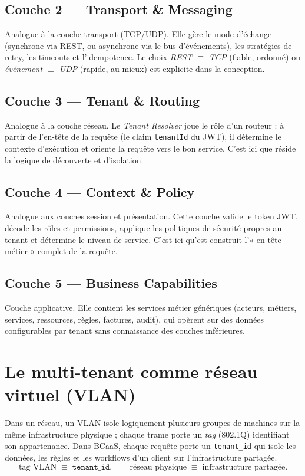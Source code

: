 \subsection{Couche 2 --- Transport \& Messaging}
Analogue à la couche transport (TCP/UDP). Elle gère le mode d'échange (synchrone via REST,
ou asynchrone via le bus d'événements), les stratégies de retry, les timeouts et
l'idempotence. Le choix \emph{REST $\equiv$ TCP} (fiable, ordonné) ou \emph{événement
$\equiv$ UDP} (rapide, au mieux) est explicite dans la conception.

\subsection{Couche 3 --- Tenant \& Routing}
Analogue à la couche réseau. Le \emph{Tenant Resolver} joue le rôle d'un routeur : à partir
de l'en-tête de la requête (le claim \texttt{tenantId} du JWT), il détermine le contexte
d'exécution et oriente la requête vers le bon service. C'est ici que réside la logique de
découverte et d'isolation.

\subsection{Couche 4 --- Context \& Policy}
Analogue aux couches session et présentation. Cette couche valide le token JWT, décode les
rôles et permissions, applique les politiques de sécurité propres au tenant et détermine le
niveau de service. C'est ici qu'est construit l'« en-tête métier » complet de la requête.

\subsection{Couche 5 --- Business Capabilities}
Couche applicative. Elle contient les services métier génériques (acteurs, métiers,
services, ressources, règles, factures, audit), qui opèrent sur des données configurables
par tenant sans connaissance des couches inférieures.

\section{Le multi-tenant comme réseau virtuel (VLAN)}

\begin{analogie}
Dans un réseau, un VLAN isole logiquement plusieurs groupes de machines sur la même
infrastructure physique ; chaque trame porte un \emph{tag} (802.1Q) identifiant son
appartenance. Dans BCaaS, chaque requête porte un \texttt{tenant\_id} qui isole les
données, les règles et les workflows d'un client sur l'infrastructure partagée.
\[
\text{tag VLAN} \;\equiv\; \texttt{tenant\_id}, \qquad
\text{réseau physique} \;\equiv\; \text{infrastructure partagée}.
\]
\end{analogie}

